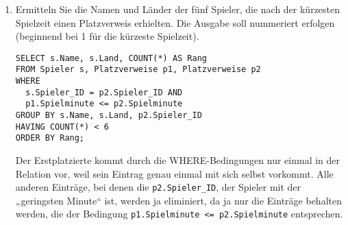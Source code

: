 \documentclass{bschlangaul-aufgabe}
\begin{document}
\begin{enumerate}

\item Ermitteln Sie die Namen und Länder der fünf Spieler, die nach der
kürzesten Spielzeit einen Platzverweis erhielten. Die Ausgabe soll
nummeriert erfolgen (beginnend bei 1 für die kürzeste Spielzeit).

\begin{bAntwort}
\begin{verbatim}
SELECT s.Name, s.Land, COUNT(*) AS Rang
FROM Spieler s, Platzverweise p1, Platzverweise p2
WHERE
  s.Spieler_ID = p2.Spieler_ID AND
  p1.Spielminute <= p2.Spielminute
GROUP BY s.Name, s.Land, p2.Spieler_ID
HAVING COUNT(*) < 6
ORDER BY Rang;
\end{verbatim}

Der Erstplatzierte kommt durch die WHERE-Bedingungen nur einmal in der
Relation vor, weil sein Eintrag genau einmal mit sich selbst vorkommt.
Alle anderen Einträge, bei denen die \texttt{p2.Spieler\_ID}, der
Spieler mit der „geringsten Minute“ ist, werden ja eliminiert, da ja nur
die Einträge behalten werden, die der Bedingung \texttt{p1.Spielminute
<= p2.Spielminute} entsprechen.
\end{bAntwort}

\end{enumerate}
\end{document}

